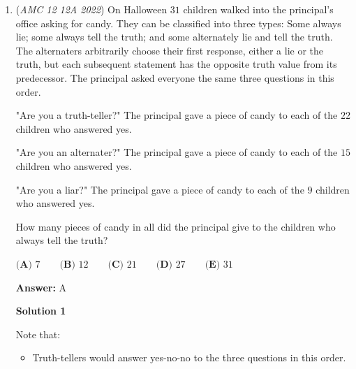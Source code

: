 \begin{enumerate}
\textbf{Solution 4}

Set the product equal to P. We get
 \[\sqrt[3]{10} \cdot \sqrt[3]{\sqrt[3]{10}} \cdot \sqrt[3]{\sqrt[3]{\sqrt[3]{10}}} \cdots=P\] Since this is an infinite product, there may exist a clever manipulation where we set two different espressions involving $P$ equal, from which we could solve for a number. Since all terms are raised to the $\frac{1}{3}$ power, we can cube both sides of our equation. We would get 
 \[10 \cdot \sqrt[3]{10} \cdot \sqrt[3]{\sqrt[3]{10}} \cdot \sqrt[3]{\sqrt[3]{\sqrt[3]{10}}} \cdots=P^3\] From this, we know that $\frac{P^3}{10}=P$, and to this equation, the only solution is $P = \boxed{\sqrt{10}}$



	\item (\textit{AMC 12 12A 2022}) On Halloween $31$ children walked into the principal's office asking for candy. They
can be classified into three types: Some always lie; some always tell the truth; and
some alternately lie and tell the truth. The alternaters arbitrarily choose their first
response, either a lie or the truth, but each subsequent statement has the opposite
truth value from its predecessor. The principal asked everyone the same three
questions in this order.


 "Are you a truth-teller?" The principal gave a piece of candy to each of the $22$
children who answered yes.


 "Are you an alternater?" The principal gave a piece of candy to each of the $15$
children who answered yes.


 "Are you a liar?" The principal gave a piece of candy to each of the $9$ children who
answered yes.


 How many pieces of candy in all did the principal give to the children who always
tell the truth?


 $\textbf{(A) } 7 \qquad \textbf{(B) } 12 \qquad \textbf{(C) } 21 \qquad \textbf{(D) } 27 \qquad \textbf{(E) } 31$

 \textbf{Answer: }A



\textbf{Solution 1}

Note that:

 
            \begin{itemize}
        \item Truth-tellers would answer yes-no-no to the three questions in this order.
            \end{itemize}
            

\end{enumerate}
